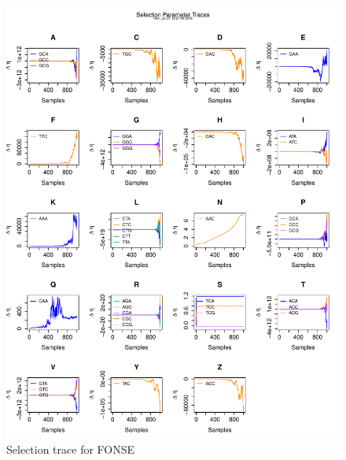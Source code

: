 \documentclass[11pt]{labbook}
\begin{document}
    \begin{figure}
        \centering
        \includegraphics[scale=.65]{FONSE_Plots/2016/June_27/Run1_SelectionTrace}
        \caption{Selection trace for FONSE}
        \label{fig:JUN27_FSEL}
    \end{figure}
\end{document}

